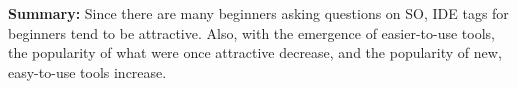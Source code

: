\documentclass[conference]{IEEEtran}
\begin{document}



\noindent \textbf{Summary:}
Since there are many beginners asking questions on SO, IDE tags for beginners tend to be attractive. Also, with the emergence of easier-to-use tools, the popularity of what were once attractive decrease, and the popularity of new, easy-to-use tools increase.

\end{document}
